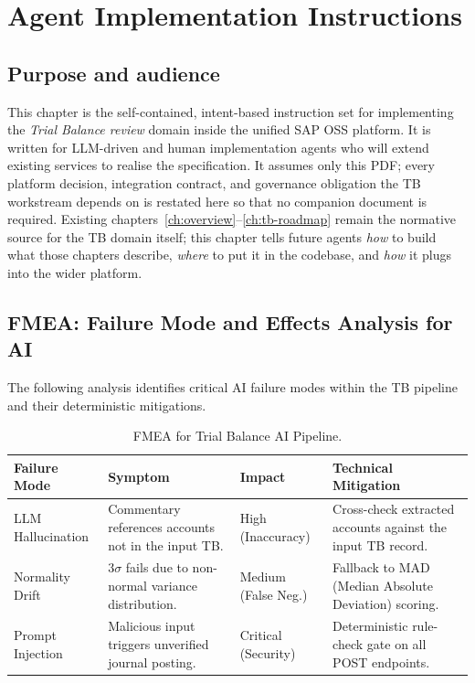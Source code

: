 \chapter{Agent Implementation Instructions}\label{ch:agent-impl}

\section{Purpose and audience}
This chapter is the self-contained, intent-based instruction set for
implementing the \emph{Trial Balance review} domain inside the
unified SAP OSS platform. It is written for LLM-driven and human
implementation agents who will extend existing services to realise
the specification. It assumes only this PDF; every platform
decision, integration contract, and governance obligation the TB
workstream depends on is restated here so that no companion document
is required. Existing chapters~\ref{ch:overview}--\ref{ch:tb-roadmap}
remain the normative source for the TB domain itself; this chapter
tells future agents \emph{how} to build what those chapters
describe, \emph{where} to put it in the codebase, and \emph{how} it
plugs into the wider platform.



\section{FMEA: Failure Mode and Effects Analysis for AI}
\label{sec:fmea-ai}

The following analysis identifies critical AI failure modes within the TB pipeline and their deterministic mitigations.

\begin{table}[htbp]
\centering
\footnotesize
\caption{FMEA for Trial Balance AI Pipeline.}
\label{tab:tb-fmea}
\begin{tabularx}{\textwidth}{@{}l X X X@{}}
\toprule
\textbf{Failure Mode} & \textbf{Symptom} & \textbf{Impact} & \textbf{Technical Mitigation} \\
\midrule
LLM Hallucination & Commentary references accounts not in the input TB. & High (Inaccuracy) & Cross-check extracted accounts against the input TB record. \\
Normality Drift & $3\sigma$ fails due to non-normal variance distribution. & Medium (False Neg.) & Fallback to MAD (Median Absolute Deviation) scoring. \\
Prompt Injection & Malicious input triggers unverified journal posting. & Critical (Security) & Deterministic rule-check gate on all POST endpoints. \\
\bottomrule
\end{tabularx}
\end{table}

